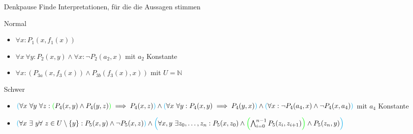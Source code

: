 {
\begin{frame}{Denkpause}
    Finde Interpretationen, für die die Aussagen stimmen
    \begin{block}{Normal}
        \begin{itemize}
            \item $\forall x: {P_1(x,f_1(x))}$
            \item $\forall x\ \forall y : P_2(x,y)\land \forall x : \lnot P_2(a_2,x)$ mit $a_2$ Konstante
            \item $\forall x : \left(P_{3a}(x,f_3(x))\land P_{3b}(f_3(x),x)\right)$ mit $U=\mathbb{N}$ %
        \end{itemize}
    \end{block}
    \begin{block}{Schwer}
        \begin{itemize}
            \item $\cleft[cyan](
                      \forall x\ \forall y\ \forall z :
                      \cleft[green](
                      P_4(x,y) \land P_4(y,z)
                      \cright[green])
                      \implies P_4(x,z)
                      \cright[cyan])
                      \land
                      \cleft[cyan](
                      \forall x\ \forall y : P_4(x,y) \implies P_4(y,x)
                      \cright[cyan])
                      \land
                      \cleft[cyan](
                      \forall x : \lnot P_4(a_4, x) \land \lnot P_4(x, a_4)
                      \cright[cyan])$
                  mit $a_4$ Konstante
            \item $\cleft[cyan](
                      \forall x\ \exists\ y \forall\ z \in U\setminus\{y\} : P_5(x,y)\land\lnot P_5(x,z)
                      \cright[cyan])
                      \land
                      \cleft[cyan](
                      \forall x,y\ \exists z_0,\dots,z_n : P_5(x,z_0) \land \cleft[green](
                      \bigwedge_{i=0}^{n-1} P_5(z_i,z_{i+1})
                      \cright[green])
                      \land P_5(z_n,y)
                      \cright[cyan])$
        \end{itemize}
    \end{block}
\end{frame}

}
